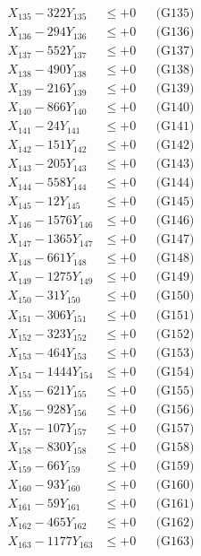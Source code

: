 \documentclass[a4paper,10pt]{article}
\begin{document}
{\begin{align}
X_{135} - 322Y_{135} &\leq +0 && \text{(G135)} \\
X_{136} - 294Y_{136} &\leq +0 && \text{(G136)} \\
X_{137} - 552Y_{137} &\leq +0 && \text{(G137)} \\
X_{138} - 490Y_{138} &\leq +0 && \text{(G138)} \\
X_{139} - 216Y_{139} &\leq +0 && \text{(G139)} \\
X_{140} - 866Y_{140} &\leq +0 && \text{(G140)} \\
\allowbreak
X_{141} - 24Y_{141} &\leq +0 && \text{(G141)} \\
X_{142} - 151Y_{142} &\leq +0 && \text{(G142)} \\
X_{143} - 205Y_{143} &\leq +0 && \text{(G143)} \\
X_{144} - 558Y_{144} &\leq +0 && \text{(G144)} \\
X_{145} - 12Y_{145} &\leq +0 && \text{(G145)} \\
X_{146} - 1576Y_{146} &\leq +0 && \text{(G146)} \\
X_{147} - 1365Y_{147} &\leq +0 && \text{(G147)} \\
X_{148} - 661Y_{148} &\leq +0 && \text{(G148)} \\
X_{149} - 1275Y_{149} &\leq +0 && \text{(G149)} \\
X_{150} - 31Y_{150} &\leq +0 && \text{(G150)} \\
\allowbreak
X_{151} - 306Y_{151} &\leq +0 && \text{(G151)} \\
X_{152} - 323Y_{152} &\leq +0 && \text{(G152)} \\
X_{153} - 464Y_{153} &\leq +0 && \text{(G153)} \\
X_{154} - 1444Y_{154} &\leq +0 && \text{(G154)} \\
X_{155} - 621Y_{155} &\leq +0 && \text{(G155)} \\
X_{156} - 928Y_{156} &\leq +0 && \text{(G156)} \\
X_{157} - 107Y_{157} &\leq +0 && \text{(G157)} \\
X_{158} - 830Y_{158} &\leq +0 && \text{(G158)} \\
X_{159} - 66Y_{159} &\leq +0 && \text{(G159)} \\
X_{160} - 93Y_{160} &\leq +0 && \text{(G160)} \\
\allowbreak
X_{161} - 59Y_{161} &\leq +0 && \text{(G161)} \\
X_{162} - 465Y_{162} &\leq +0 && \text{(G162)} \\
X_{163} - 1177Y_{163} &\leq +0 && \text{(G163)} \\

\end{align}}
\end{document}
